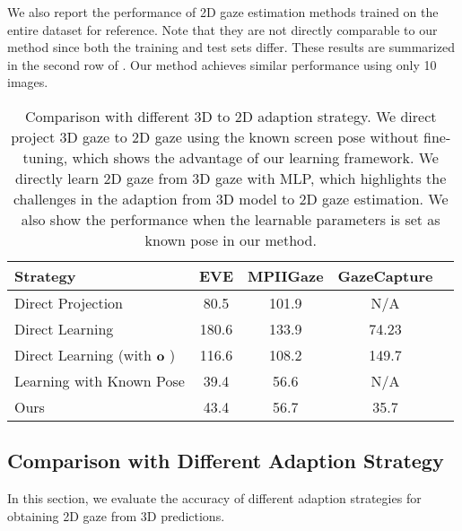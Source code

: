 We also report the performance of 2D gaze estimation methods trained on the entire dataset for reference. Note that they are not directly comparable to our method since both the training and test sets differ. These results are summarized in the second row of . Our method achieves similar performance using only 10 images.                                                               
\begin{table}[t]
    \setlength\tabcolsep{4pt}
    
    \renewcommand\arraystretch{1.0}
    \small
    \caption{Comparison with different 3D to 2D adaption strategy. We direct project 3D gaze to 2D gaze using the known screen pose without fine-tuning, which shows the advantage of our learning framework. We directly learn 2D gaze from 3D gaze with MLP, which highlights the challenges in the adaption from 3D model to 2D gaze estimation. We also show the performance when the learnable parameters is set as known pose in our method.\vspace{-2mm} }
      \centering
        \begin{tabular}{l|cccc}
        \toprule[1.0pt]
         Strategy& EVE &MPIIGaze &GazeCapture\\
        \hline
        Direct Projection &80.5& 101.9 & N/A\\
        Direct Learning  &180.6&133.9&74.23\\
        Direct Learning (with $\mathbf{o}$ ) &116.6&108.2&149.7\\
        \hline
        Learning with Known Pose&39.4&56.6&N/A\\
        \rowcolor{rowcolor}Ours& 43.4& 56.7&35.7\\
        \bottomrule[1.0pt]
    \end{tabular}
    \vspace{-2mm}
     \label{tab:diffproj}
\end{table}


\subsection{Comparison with Different Adaption Strategy}
In this section, we evaluate the accuracy of different adaption strategies for obtaining 2D gaze from 3D predictions.


